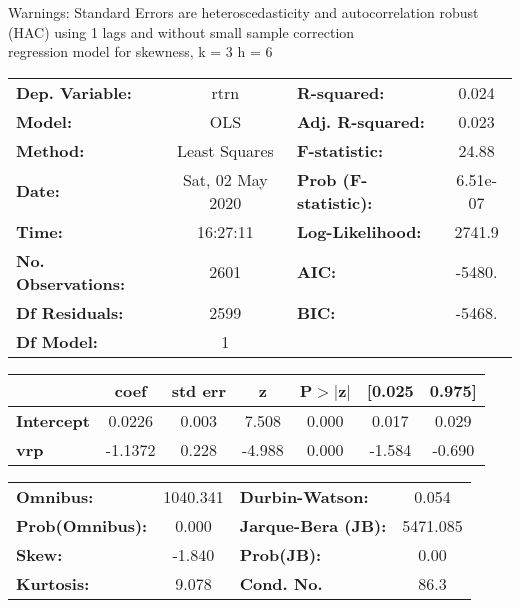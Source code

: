 Warnings: \newline
 [1] Standard Errors are heteroscedasticity and autocorrelation robust (HAC) using 1 lags and without small sample correction\\ 

regression model for skewness, k = 3 h = 6\begin{center}
\begin{tabular}{lclc}
\toprule
\textbf{Dep. Variable:}    &       rtrn       & \textbf{  R-squared:         } &     0.024   \\
\textbf{Model:}            &       OLS        & \textbf{  Adj. R-squared:    } &     0.023   \\
\textbf{Method:}           &  Least Squares   & \textbf{  F-statistic:       } &     24.88   \\
\textbf{Date:}             & Sat, 02 May 2020 & \textbf{  Prob (F-statistic):} &  6.51e-07   \\
\textbf{Time:}             &     16:27:11     & \textbf{  Log-Likelihood:    } &    2741.9   \\
\textbf{No. Observations:} &        2601      & \textbf{  AIC:               } &    -5480.   \\
\textbf{Df Residuals:}     &        2599      & \textbf{  BIC:               } &    -5468.   \\
\textbf{Df Model:}         &           1      & \textbf{                     } &             \\
\bottomrule
\end{tabular}
\begin{tabular}{lcccccc}
                   & \textbf{coef} & \textbf{std err} & \textbf{z} & \textbf{P$> |$z$|$} & \textbf{[0.025} & \textbf{0.975]}  \\
\midrule
\textbf{Intercept} &       0.0226  &        0.003     &     7.508  &         0.000        &        0.017    &        0.029     \\
\textbf{vrp}       &      -1.1372  &        0.228     &    -4.988  &         0.000        &       -1.584    &       -0.690     \\
\bottomrule
\end{tabular}
\begin{tabular}{lclc}
\textbf{Omnibus:}       & 1040.341 & \textbf{  Durbin-Watson:     } &    0.054  \\
\textbf{Prob(Omnibus):} &   0.000  & \textbf{  Jarque-Bera (JB):  } & 5471.085  \\
\textbf{Skew:}          &  -1.840  & \textbf{  Prob(JB):          } &     0.00  \\
\textbf{Kurtosis:}      &   9.078  & \textbf{  Cond. No.          } &     86.3  \\
\bottomrule
\end{tabular}
\end{center}

